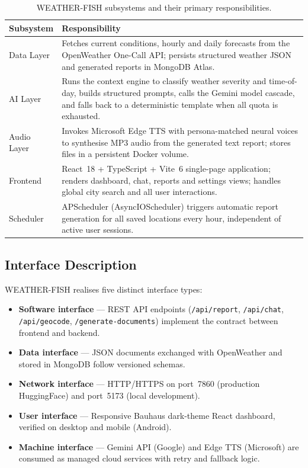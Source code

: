 \documentclass[11pt, a4paper]{article}
\begin{document}
\begin{table}[H]
  \centering
  \caption{WEATHER-FISH subsystems and their primary responsibilities.}
  \label{tab:subsystems}
  \begin{tabularx}{\linewidth}{@{}lX@{}}
    \toprule
    \textbf{Subsystem} & \textbf{Responsibility} \\
    \midrule
    Data Layer      & Fetches current conditions, hourly and daily forecasts from the OpenWeather
                      One-Call API; persists structured weather JSON and generated reports in
                      MongoDB Atlas. \\[4pt]
    AI Layer        & Runs the context engine to classify weather severity and time-of-day, builds
                      structured prompts, calls the Gemini model cascade, and falls back to a
                      deterministic template when all quota is exhausted. \\[4pt]
    Audio Layer     & Invokes Microsoft Edge TTS with persona-matched neural voices to synthesise
                      MP3 audio from the generated text report; stores files in a persistent
                      Docker volume. \\[4pt]
    Frontend        & React~18 + TypeScript + Vite~6 single-page application; renders dashboard,
                      chat, reports and settings views; handles global city search and all
                      user interactions. \\[4pt]
    Scheduler       & APScheduler (AsyncIOScheduler) triggers automatic report generation for all
                      saved locations every hour, independent of active user sessions. \\
    \bottomrule
  \end{tabularx}
\end{table}

\subsection{Interface Description}

WEATHER-FISH realises five distinct interface types:

\begin{itemize}[noitemsep]
  \item \textbf{Software interface} — REST API endpoints (\texttt{/api/report},
        \texttt{/api/chat}, \texttt{/api/geocode}, \texttt{/generate-documents})
        implement the contract between frontend and backend.
  \item \textbf{Data interface} — JSON documents exchanged with OpenWeather and
        stored in MongoDB follow versioned schemas.
  \item \textbf{Network interface} — HTTP/HTTPS on port~7860 (production HuggingFace)
        and port~5173 (local development).
  \item \textbf{User interface} — Responsive Bauhaus dark-theme React dashboard,
        verified on desktop and mobile (Android).
  \item \textbf{Machine interface} — Gemini API (Google) and Edge TTS (Microsoft)
        are consumed as managed cloud services with retry and fallback logic.
\end{itemize}
\end{document}
